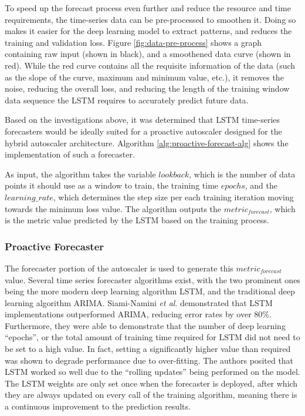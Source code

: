 To speed up the forecast process even further and reduce the resource and time requirements, the time-series data can be pre-processed to smoothen it. Doing so makes it easier for the deep learning model to extract patterns, and reduces the training and validation loss. Figure \ref{fig:data-pre-process} shows a graph containing raw input (shown in black), and a smoothened data curve (shown in red). While the red curve contains all the requisite information of the data (such as the slope of the curve, maximum and minimum value, etc.), it removes the noise, reducing the overall loss, and reducing the length of the training window data sequence the LSTM requires to accurately predict future data.\par

Based on the investigations above, it was determined that LSTM time-series forecasters would be ideally suited for a proactive autoscaler designed for the hybrid autoscaler architecture. Algorithm \ref{alg:proactive-forecast-alg} shows the implementation of such a forecaster.\par

As input, the algorithm takes the variable $lookback$, which is the number of data points it should use as a window to train, the training time $epochs$, and the $learning\_rate$, which determines the step size per each training iteration moving towards the minimum loss value. The algorithm outputs the $metric_{forecast}$, which is the metric value predicted by the LSTM based on the training process.\par

\subsubsection{Proactive Forecaster}

The forecaster portion of the autoscaler is used to generate this $metric_{forecast}$ value. Several time series forecaster algorithms exist, with the two prominent ones being the more modern deep learning algorithm LSTM, and the traditional deep learning algorithm ARIMA. Siami-Namini \textit{et al}. \cite{siami2018comparison} demonstrated that LSTM implementations outperformed ARIMA, reducing error rates by over 80\%. Furthermore, they were able to demonstrate that the number of deep learning ``epochs'', or the total amount of training time required for LSTM did not need to be set to a high value. In fact, setting a significantly higher value than required was shown to degrade performance due to over-fitting. The authors posited that LSTM worked so well due to the ``rolling updates'' being performed on the model. The LSTM weights are only set once when the forecaster is deployed, after which they are always updated on every call of the training algorithm, meaning there is a continuous improvement to the prediction results.\par

